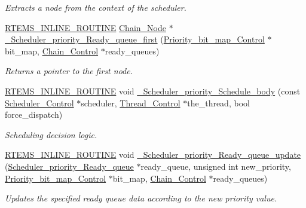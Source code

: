 \begin{DoxyCompactItemize}
\begin{DoxyCompactList}\small\item\em Extracts a node from the context of the scheduler. \end{DoxyCompactList}\item 
\mbox{\hyperlink{group__RTEMSScoreBaseDefs_gac216239df231d5dbd15e3520b0b9313f}{R\+T\+E\+M\+S\+\_\+\+I\+N\+L\+I\+N\+E\+\_\+\+R\+O\+U\+T\+I\+NE}} \mbox{\hyperlink{group__RTEMSScoreChain_ga0dd4bfcca1ac7f90de2842e447846d3d}{Chain\+\_\+\+Node}} $\ast$ \mbox{\hyperlink{group__RTEMSScoreSchedulerDPS_ga8d8a162be45d44eb572a6d2a243249cb}{\+\_\+\+Scheduler\+\_\+priority\+\_\+\+Ready\+\_\+queue\+\_\+first}} (\mbox{\hyperlink{structPriority__bit__map__Control}{Priority\+\_\+bit\+\_\+map\+\_\+\+Control}} $\ast$bit\+\_\+map, \mbox{\hyperlink{unionChain__Control}{Chain\+\_\+\+Control}} $\ast$ready\+\_\+queues)
\begin{DoxyCompactList}\small\item\em Returns a pointer to the first node. \end{DoxyCompactList}\item 
\mbox{\hyperlink{group__RTEMSScoreBaseDefs_gac216239df231d5dbd15e3520b0b9313f}{R\+T\+E\+M\+S\+\_\+\+I\+N\+L\+I\+N\+E\+\_\+\+R\+O\+U\+T\+I\+NE}} void \mbox{\hyperlink{group__RTEMSScoreSchedulerDPS_ga8b52515687c00a3b3e8a90b0dcd6b749}{\+\_\+\+Scheduler\+\_\+priority\+\_\+\+Schedule\+\_\+body}} (const \mbox{\hyperlink{struct__Scheduler__Control}{Scheduler\+\_\+\+Control}} $\ast$scheduler, \mbox{\hyperlink{struct__Thread__Control}{Thread\+\_\+\+Control}} $\ast$the\+\_\+thread, bool force\+\_\+dispatch)
\begin{DoxyCompactList}\small\item\em Scheduling decision logic. \end{DoxyCompactList}\item 
\mbox{\hyperlink{group__RTEMSScoreBaseDefs_gac216239df231d5dbd15e3520b0b9313f}{R\+T\+E\+M\+S\+\_\+\+I\+N\+L\+I\+N\+E\+\_\+\+R\+O\+U\+T\+I\+NE}} void \mbox{\hyperlink{group__RTEMSScoreSchedulerDPS_ga6acac442055201dbdda485d7b0021628}{\+\_\+\+Scheduler\+\_\+priority\+\_\+\+Ready\+\_\+queue\+\_\+update}} (\mbox{\hyperlink{structScheduler__priority__Ready__queue}{Scheduler\+\_\+priority\+\_\+\+Ready\+\_\+queue}} $\ast$ready\+\_\+queue, unsigned int new\+\_\+priority, \mbox{\hyperlink{structPriority__bit__map__Control}{Priority\+\_\+bit\+\_\+map\+\_\+\+Control}} $\ast$bit\+\_\+map, \mbox{\hyperlink{unionChain__Control}{Chain\+\_\+\+Control}} $\ast$ready\+\_\+queues)
\begin{DoxyCompactList}\small\item\em Updates the specified ready queue data according to the new priority value. \end{DoxyCompactList}\end{DoxyCompactItemize}


